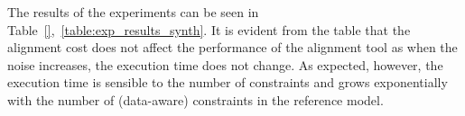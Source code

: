 The results of the experiments can be seen in Table~\ref{},~\ref{table:exp_results_synth}. It is evident from the table that the alignment cost does not affect the performance of the alignment tool as when the noise increases, the execution time does not change. As expected, however, the execution time is sensible to the number of constraints and grows exponentially with the number of (data-aware) constraints in the reference model.

%
%

